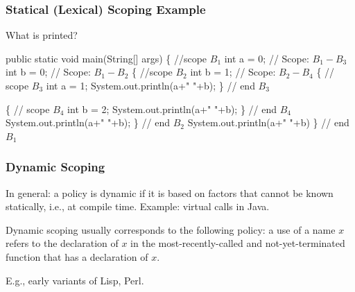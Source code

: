 \documentclass{beamer}
\newcommand{\emp}[1]{\textcolor{DikuRed}{ #1}}
\newcommand{\emphh}[1]{\textcolor{CosGreen}{ #1}}
\newcommand{\emphb}[1]{\textcolor{CosBlue}{ #1}}
\newcommand{\mymath}[1]{$ #1 $}
\newcommand{\myindx}[1]{_{#1}}
\begin{document}
\begin{frame}[fragile,t]
\frametitle{Statical (Lexical) Scoping Example}

\begin{block}{What is printed? }
\begin{colorcode}[fontsize=\scriptsize]
public static void main(String[] args) \{                        \emphh{//scope \mymath{B\myindx{1}}}
    int a = 0;     // Scope: \mymath{B\myindx{1} - B\myindx{3}} 
    int b = 0;     // Scope: \mymath{B\myindx{1} - B\myindx{2}}
    \{                                                    \emphb{//scope \mymath{B\myindx{2}}}
        int b = 1; // Scope: \mymath{B\myindx{2} - B\myindx{4}} 
        \{                                        //\emp{scope \mymath{B\myindx{3}}}
            int a = 1; System.out.println(a+" "+b);
        \}                                        //\emp{end \mymath{B\myindx{3}}}

        \{                                        //\emp{scope \mymath{B\myindx{4}}}
            int b = 2; System.out.println(a+" "+b);
        \}                                        //\emp{end \mymath{B\myindx{4}}}
        System.out.println(a+" "+b);
    \}                                                    //\emphb{end \mymath{B\myindx{2}}}
    System.out.println(a+" "+b)
\}                                                               //\emphh{end \mymath{B\myindx{1}}}
\end{colorcode}
\end{block}

\end{frame}



\begin{frame}
\frametitle{Dynamic Scoping}

In general: a policy is dynamic if it is based on factors that cannot be
known statically, i.e., at compile time. Example: virtual calls in Java.


\bigskip

Dynamic scoping usually corresponds to the following policy: a use of
a name $x$ refers to the declaration of $x$ in the most-recently-called
and not-yet-terminated function that has a declaration of $x$.

\smallskip

E.g., early variants of Lisp, Perl.

\end{frame}
\end{document}
